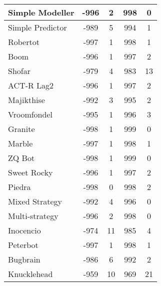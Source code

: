 \begin{table}
\begin{tabular}{|l|c|c|c|c|}
Simple Modeller & -996 & 2 & 998 & 0 \\ \hline 
Simple Predictor & -989 & 5 & 994 & 1 \\ \hline 
Robertot & -997 & 1 & 998 & 1 \\ \hline 
Boom & -996 & 1 & 997 & 2 \\ \hline 
Shofar & -979 & 4 & 983 & 13 \\ \hline 
ACT-R Lag2 & -996 & 1 & 997 & 2 \\ \hline 
Majikthise & -992 & 3 & 995 & 2 \\ \hline 
Vroomfondel & -995 & 1 & 996 & 3 \\ \hline 
Granite & -998 & 1 & 999 & 0 \\ \hline 
Marble & -997 & 1 & 998 & 1 \\ \hline 
ZQ Bot & -998 & 1 & 999 & 0 \\ \hline 
Sweet Rocky & -996 & 1 & 997 & 2 \\ \hline 
Piedra & -998 & 0 & 998 & 2 \\ \hline 
Mixed Strategy & -992 & 4 & 996 & 0 \\ \hline 
Multi-strategy & -996 & 2 & 998 & 0 \\ \hline 
Inocencio & -974 & 11 & 985 & 4 \\ \hline 
Peterbot & -997 & 1 & 998 & 1 \\ \hline 
Bugbrain & -986 & 6 & 992 & 2 \\ \hline 
Knucklehead & -959 & 10 & 969 & 21 \\ \hline
        \end{tabular}
    \end{table}